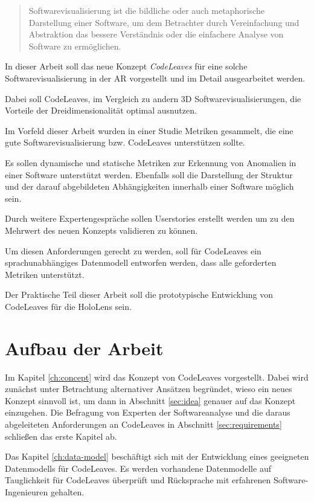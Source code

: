 \begin{quotation}
Softwarevisualisierung ist die bildliche oder auch metaphorische Darstellung einer Software, um dem Betrachter durch Vereinfachung und Abstraktion das bessere Verständnis oder die einfachere Analyse von Software zu ermöglichen.
\end{quotation}

In dieser Arbeit soll das neue Konzept \emph{CodeLeaves} für eine solche Softwarevisualisierung in der AR vorgestellt und im Detail ausgearbeitet werden.

Dabei soll CodeLeaves, im Vergleich zu andern 3D Softwarevisualisierungen, die Vorteile der Dreidimensionalität optimal ausnutzen.

Im Vorfeld dieser Arbeit wurden in einer Studie Metriken gesammelt, die eine gute Softwarevisualisierung bzw. CodeLeaves unterstützen sollte.

Es sollen dynamische und statische Metriken zur Erkennung von Anomalien in einer Software unterstützt werden. Ebenfalls soll die Darstellung der Struktur und der darauf abgebildeten Abhängigkeiten innerhalb einer Software möglich sein.

Durch weitere Expertengespräche sollen Userstories erstellt werden um zu den Mehrwert des neuen Konzepts validieren zu können.

Um diesen Anforderungen gerecht zu werden, soll für CodeLeaves ein sprachunabhängiges Datenmodell entworfen werden, dass alle geforderten Metriken unterstützt.

Der Praktische Teil dieser Arbeit soll die prototypische Entwicklung von CodeLeaves für die HoloLens sein.

\section{Aufbau der Arbeit}
Im Kapitel \ref{ch:concept} wird das Konzept von CodeLeaves vorgestellt. Dabei wird zunächst unter Betrachtung alternativer Ansätzen begründet, wieso ein neues Konzept sinnvoll ist, um dann in Abschnitt \ref{sec:idea} genauer auf das Konzept einzugehen. Die Befragung von Experten der Softwareanalyse und die daraus abgeleiteten Anforderungen an CodeLeaves in Abschnitt \ref{sec:requirements} schließen das erste Kapitel ab.

Das Kapitel \ref{ch:data-model} beschäftigt sich mit der Entwicklung eines geeigneten Datenmodells für CodeLeaves. Es werden vorhandene Datenmodelle auf Tauglichkeit für CodeLeaves überprüft und Rücksprache mit erfahrenen Software-Ingenieuren gehalten.

